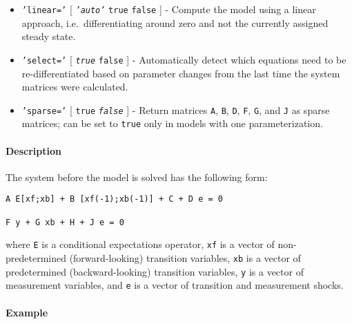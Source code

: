\begin{itemize}
\item
  \texttt{'linear='} {[} \emph{\texttt{'auto'}} \textbar{} \texttt{true}
  \textbar{} \texttt{false} {]} - Compute the model using a linear
  approach, i.e.~differentiating around zero and not the currently
  assigned steady state.
\item
  \texttt{'select='} {[} \emph{\texttt{true}} \textbar{} \texttt{false}
  {]} - Automatically detect which equations need to be
  re-differentiated based on parameter changes from the last time the
  system matrices were calculated.
\item
  \texttt{'sparse='} {[} \texttt{true} \textbar{} \emph{\texttt{false}}
  {]} - Return matrices \texttt{A}, \texttt{B}, \texttt{D}, \texttt{F},
  \texttt{G}, and \texttt{J} as sparse matrices; can be set to
  \texttt{true} only in models with one parameterization.
\end{itemize}

\paragraph{Description}

The system before the model is solved has the following form:

\begin{verbatim}
A E[xf;xb] + B [xf(-1);xb(-1)] + C + D e = 0

F y + G xb + H + J e = 0
\end{verbatim}

where \texttt{E} is a conditional expectations operator, \texttt{xf} is
a vector of non-predetermined (forward-looking) transition variables,
\texttt{xb} is a vector of predetermined (backward-looking) transition
variables, \texttt{y} is a vector of measurement variables, and
\texttt{e} is a vector of transition and measurement shocks.

\paragraph{Example}


